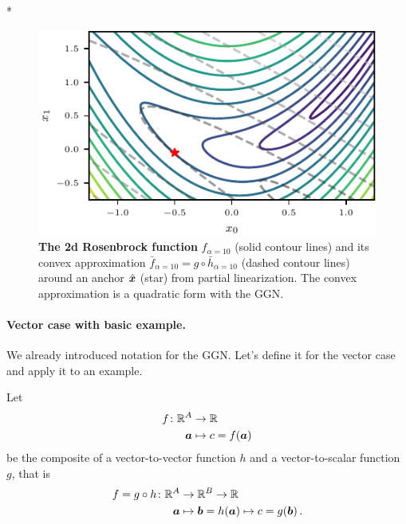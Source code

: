 \switchcolumn[1]*
\begin{figure}[H]
  \centering
  \includegraphics[width=\linewidth]{../kfs/plots/linearized_rosenbrock.pdf}
  \caption{\textbf{The 2d Rosenbrock function} $f_{\alpha=10}$ (solid contour lines) and its convex approximation $\bar{f}_{\alpha=10} = g \circ \bar{h}_{\alpha=10}$ (dashed contour lines) around an anchor $\hat{{\bm{x}}}$ (star) from partial linearization.
    The convex approximation is a quadratic form with the GGN.}\label{fig:2d-rosenbrock}
\end{figure}
\switchcolumn[0]

\paragraph{Vector case with basic example.}
We already introduced notation for the GGN.
Let's define it for the vector case and apply it to an example.

\switchcolumn[1]
\switchcolumn[0]

\begin{setup}\label{setup:composite_vector_to_vector_to_scalar_function}
  Let
  \begin{align*}
    f\colon {\mathbb{R}}^{A} & \to {\mathbb{R}}
    \\
    {\bm{a}}        & \mapsto c = f({\bm{a}})
  \end{align*}
  be the composite of a vector-to-vector function $h$ and a vector-to-scalar function $g$, that is
  \begin{align*}
    f = g \circ h\colon {\mathbb{R}}^A & \to {\mathbb{R}}^B \to {\mathbb{R}}
    \\
    {\bm{a}}                  & \mapsto {\bm{b}} = h({\bm{a}}) \mapsto c = g({\bm{b}})\,.
  \end{align*}
\end{setup}

